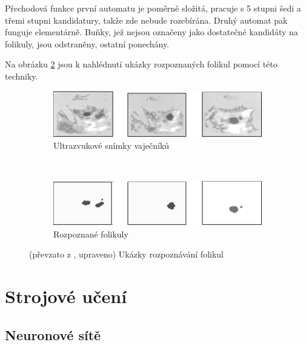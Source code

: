 \documentclass[a4paper,10pt]{article}
\begin{document}
Přechodová funkce první automatu je poměrně složitá, pracuje s 5 stupni šedi a třemi stupni kandidatury, takže zde nebude rozebírána. Druhý automat pak funguje elementárně. Buňky, jež nejsou označeny jako dostatečné kandidáty na folikuly, jsou odstraněny, ostatní ponechány.

Na obrázku \ref{img:Follicles} jsou k nahlédnutí ukázky rozpoznaných folikul pomocí této techniky.

\begin{figure}
  \begin{subfigure}[t]{\textwidth} \centering
    \includegraphics[width=\textwidth]{follicles-1}
    \caption{Ultrazvukové snímky vaječníků} \label{img:Follicles:Screens}
  \end{subfigure}
  \\
  \begin{subfigure}[t]{\textwidth} \centering
    \includegraphics[width=\textwidth]{follicles-2}
    \caption{Rozpoznané folikuly}
  \end{subfigure}
 
  \caption{(převzato z \cite{WanJiaZhoDu-ImProcBasFuzCelAuMod}, upraveno) Ukázky rozpoznávání folikul} \label{img:Follicles}
\end{figure}



\section{Strojové učení}


\subsection{Neuronové sítě}
\end{document}
